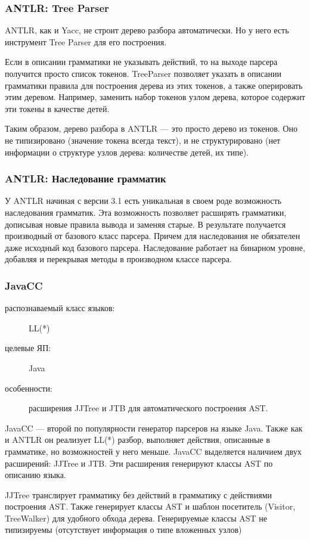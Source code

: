 \documentclass[a4paper,12pt,titlepage]{extarticle}
\begin{document}
\subsubsection*{ANTLR: Tree Parser}
ANTLR, как и Yacc, не строит дерево разбора автоматически. Но у него есть
инструмент Tree Parser для его построения.

Если в описании грамматики не указывать действий, то на выходе парсера получится
просто список токенов. TreeParser позволяет указать в описании грамматики
правила для построения дерева из этих токенов, а также оперировать этим деревом.
Например, заменить набор токенов узлом дерева, которое содержит эти токены в
качестве детей.

Таким образом, дерево разбора в ANTLR --- это просто дерево из токенов. Оно не
типизировано (значение токена всегда текст), и не структурировано (нет
информации о структуре узлов дерева: количестве детей, их типе).

\subsubsection*{ANTLR: Наследование грамматик}
У ANTLR начиная с версии 3.1 есть уникальная в своем роде
возможность наследования грамматик. Эта возможность позволяет расширять
грамматики, дописывая новые правила вывода и заменяя старые. В результате
получается производный от базового класс парсера. Причем для наследования не
обязателен даже исходный код базового парсера. Наследование работает на
бинарном уровне, добавляя и перекрывая методы в производном классе парсера.

\subsubsection*{JavaCC}
\begin{description}
  \item[распознаваемый класс языков:] LL(*)
  \item[целевые ЯП:] Java
  \item[особенности:] расширения JJTree и JTB для автоматического построения
  AST.
\end{description}
JavaCC --- второй по популярности генератор парсеров на языке Java. Также как и
ANTLR он реализует LL(*) разбор, выполняет действия, описанные в грамматике, но
возможностей у него меньше. JavaCC выделяется наличием двух расширений: JJTree и
JTB. Эти расширения генерируют классы AST по описанию языка.

JJTree транслирует грамматику без действий в грамматику с действиями
построения AST. Также генерирует классы AST и шаблон посетитель
(Visitor, TreeWalker) для удобного обхода дерева. Генерируемые классы AST не
типизируемы (отсутствует информация о типе вложенных узлов)
\end{document}
